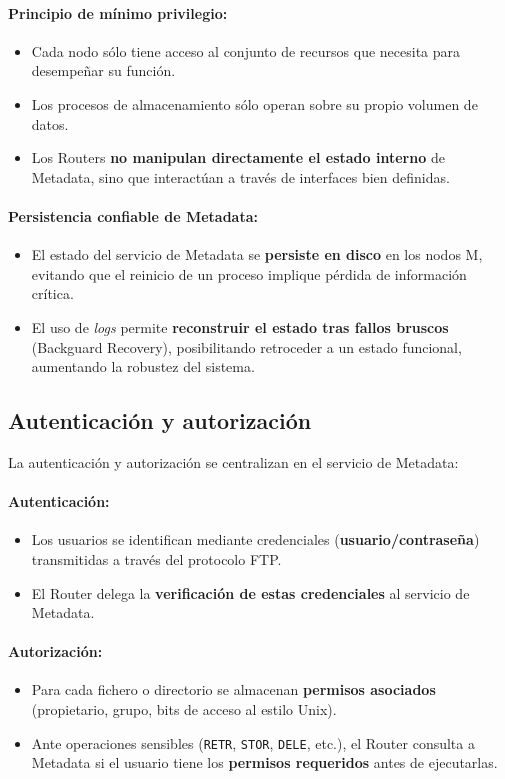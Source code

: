 \documentclass{article}
\begin{document}
\paragraph{Principio de mínimo privilegio:}
\begin{itemize}
    \item Cada nodo sólo tiene acceso al conjunto de recursos que necesita para desempeñar su función.
    \item Los procesos de almacenamiento sólo operan sobre su propio volumen de datos.
    \item Los Routers \textbf{no manipulan directamente el estado interno} de Metadata, sino que interactúan a través de interfaces bien definidas.
\end{itemize}

\paragraph{Persistencia confiable de Metadata:}
\begin{itemize}
    \item El estado del servicio de Metadata se \textbf{persiste en disco} en los nodos M, evitando que el reinicio de un proceso implique pérdida de información crítica.
    \item El uso de \emph{logs} permite \textbf{reconstruir el estado tras fallos bruscos} (Backguard Recovery), posibilitando retroceder a un estado funcional, aumentando la robustez del sistema.
\end{itemize}

\subsection{Autenticación y autorización}
La autenticación y autorización se centralizan en el servicio de Metadata:

\paragraph{Autenticación:}
\begin{itemize}
    \item Los usuarios se identifican mediante credenciales (\textbf{usuario/contraseña}) transmitidas a través del protocolo FTP.
    \item El Router delega la \textbf{verificación de estas credenciales} al servicio de Metadata.
\end{itemize}

\paragraph{Autorización:}
\begin{itemize}
    \item Para cada fichero o directorio se almacenan \textbf{permisos asociados} (propietario, grupo, bits de acceso al estilo Unix).
    \item Ante operaciones sensibles (\texttt{RETR}, \texttt{STOR}, \texttt{DELE}, etc.), el Router consulta a Metadata si el usuario tiene los \textbf{permisos requeridos} antes de ejecutarlas.
\end{itemize}
\end{document}
